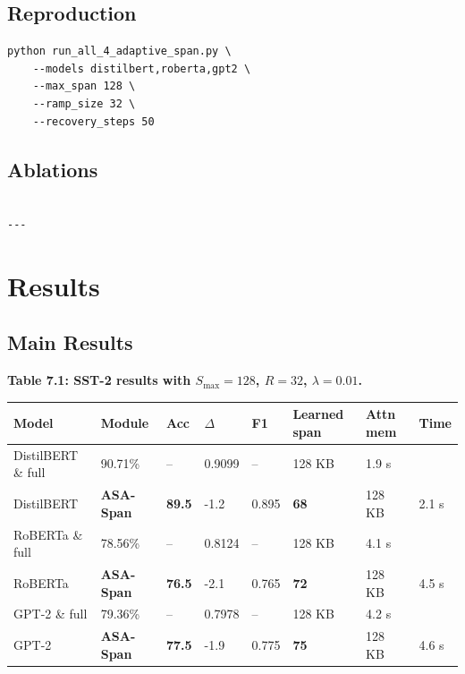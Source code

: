 \subsection{Reproduction}

\begin{lstlisting}
python run_all_4_adaptive_span.py \
    --models distilbert,roberta,gpt2 \
    --max_span 128 \
    --ramp_size 32 \
    --recovery_steps 50
\end{lstlisting}

\subsection{Ablations}

\begin{lstlisting}

---
\end{lstlisting}


\section{Results}

\subsection{Main Results}

\textbf{Table 7.1: SST-2 results with $S_\text{max} = 128$, $R = 32$, $\lambda = 0.01$.}

\begin{table}[H]
\centering
\small
\begin{tabular}{llllllll}
\toprule
\textbf{Model} & \textbf{Module} & \textbf{Acc} & \textbf{$\Delta$} & \textbf{F1} & \textbf{Learned span} & \textbf{Attn mem} & \textbf{Time} \\
\midrule
DistilBERT \& full & 90.71\% & -- & 0.9099 & -- & 128 KB & 1.9 s \\
DistilBERT & \textbf{ASA-Span} & \textbf{89.5} & -1.2 & 0.895 & \textbf{68} & 128 KB & 2.1 s \\
RoBERTa \& full & 78.56\% & -- & 0.8124 & -- & 128 KB & 4.1 s \\
RoBERTa & \textbf{ASA-Span} & \textbf{76.5} & -2.1 & 0.765 & \textbf{72} & 128 KB & 4.5 s \\
GPT-2 \& full & 79.36\% & -- & 0.7978 & -- & 128 KB & 4.2 s \\
GPT-2 & \textbf{ASA-Span} & \textbf{77.5} & -1.9 & 0.775 & \textbf{75} & 128 KB & 4.6 s \\
\bottomrule
\end{tabular}
\end{table}

